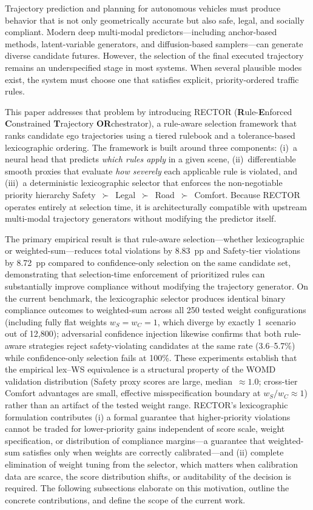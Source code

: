 Trajectory prediction and planning for autonomous vehicles must produce behavior that is not only geometrically accurate but also safe, legal, and socially compliant. Modern deep multi-modal predictors—including anchor-based methods, latent-variable generators, and diffusion-based samplers—can generate diverse candidate futures. However, the selection of the final executed trajectory remains an underspecified stage in most systems. When several plausible modes exist, the system must choose one that satisfies explicit, priority-ordered traffic rules.

This paper addresses that problem by introducing \textsc{RECTOR} (\textbf{R}ule-\textbf{E}nforced \textbf{C}onstrained \textbf{T}rajectory \textbf{OR}chestrator), a rule-aware selection framework that ranks candidate ego trajectories using a tiered rulebook and a tolerance-based lexicographic ordering.  The framework is built around three components: (i)~a neural head that predicts \emph{which rules apply} in a given scene, (ii)~differentiable smooth proxies that evaluate \emph{how severely} each applicable rule is violated, and (iii)~a deterministic lexicographic selector that enforces the non-negotiable priority hierarchy Safety~$\succ$~Legal~$\succ$~Road~$\succ$~Comfort.  Because RECTOR operates entirely at selection time, it is architecturally compatible with upstream multi-modal trajectory generators without modifying the predictor itself.

The primary empirical result is that rule-aware selection---whether lexicographic or weighted-sum---reduces total violations by 8.83~pp and Safety-tier violations by 8.72~pp compared to confidence-only selection on the same candidate set, demonstrating that selection-time enforcement of prioritized rules can substantially improve compliance without modifying the trajectory generator.  On the current benchmark, the lexicographic selector produces identical binary compliance outcomes to weighted-sum across all 250 tested weight configurations (including fully flat weights $w_S{=}w_C{=}1$, which diverge by exactly 1~scenario out of 12{,}800); adversarial confidence injection likewise confirms that both rule-aware strategies reject safety-violating candidates at the same rate (3.6--5.7\%) while confidence-only selection fails at 100\%.  These experiments establish that the empirical lex--WS equivalence is a structural property of the WOMD validation distribution (Safety proxy scores are large, median~$\approx 1.0$; cross-tier Comfort advantages are small, effective misspecification boundary at $w_S/w_C\approx1$) rather than an artifact of the tested weight range.  RECTOR's lexicographic formulation contributes (i) a formal guarantee that higher-priority violations cannot be traded for lower-priority gains independent of score scale, weight specification, or distribution of compliance margins---a guarantee that weighted-sum satisfies only when weights are correctly calibrated---and (ii) complete elimination of weight tuning from the selector, which matters when calibration data are scarce, the score distribution shifts, or auditability of the decision is required.  The following subsections elaborate on this motivation, outline the concrete contributions, and define the scope of the current work.

